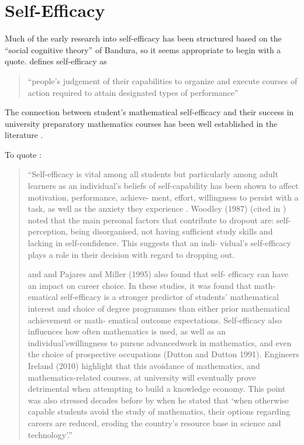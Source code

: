 \documentclass[twoside,12pt,a4paper]{report}
\begin{document}
\section{Self-Efficacy}

Much of the early research into self-efficacy has been structured based on the ``social cognitive theory'' of Bandura, so it seems appropriate to begin with a quote.  defines self-efficacy as 
\begin{quote}
``people’s judgement of their capabilities to organize and execute
courses of action required to attain designated types of performance''
\end{quote}


The connection between student's mathematical self-efficacy and their success in university preparatory mathematics courses has been well established in the literature \cite{Burton1987, Klinger2006, Klinger2011}. 

To quote :
\begin{quote}
``Self-efficacy
is vital among all students but particularly among adult learners as an individual’s
beliefs of self-capability has been shown to affect motivation, performance, achieve-
ment, effort, willingness to persist with a task, as well as the anxiety they experience
\cite{Bandura1997, Pajares1994, Pajares1996, Pajares1997, Pajares1999}. Woodley (1987) (cited in \cite{McGivney1996}) noted that the main personal
factors that contribute to dropout are: self-perception, being disorganised, not
having sufficient study skills and lacking in self-confidence. This suggests that an indi-
vidual’s self-efficacy plays a role in their decision with regard to dropping out.

\cite{Hackett1989} and \cite{Pajares1994} and Pajares and Miller (1995) also found that self-
efficacy can have an impact on career choice. In these studies, it was found that math-
ematical self-efficacy is a stronger predictor of students’ mathematical interest and
choice of degree programmes than either prior mathematical achievement or math-
ematical outcome expectations. Self-efficacy also influences how often mathematics
is used, as well as an individual’swillingness to pursue advancedwork in mathematics,
and even the choice of prospective occupations (Dutton and Dutton 1991). Engineers
Ireland (2010) highlight that this avoidance of mathematics, and mathematics-related
courses, at university will eventually prove detrimental when attempting to build a
knowledge economy. This point was also stressed decades before by \cite[pg34]{Hembree1990}
when he stated that ‘when otherwise capable students avoid the study of
mathematics, their options regarding careers are reduced, eroding the country’s
resource base in science and technology’.''
\end{quote}
\end{document}
